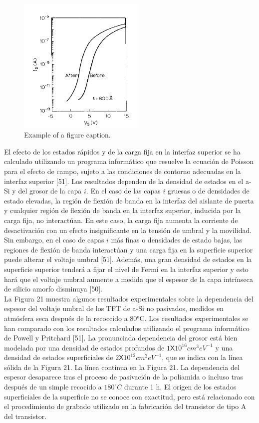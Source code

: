 \documentclass[conference]{IEEEtran}
\begin{document}
\begin{figure}[htbp]
    \centerline{\includegraphics[width=6.0cm]{img/imagen-20.png}}
    \caption{Example of a figure caption.}%
    \label{fig20}
\end{figure} 

    El efecto de los estados rápidos y de la carga fija en la interfaz superior se ha calculado 
    utilizando un programa informático que resuelve la ecuación de Poisson para el efecto de campo, 
    sujeto a las condiciones de contorno adecuadas en la interfaz superior [51].
    Los resultados dependen de la densidad de estados en el a-Si y del grosor de la capa $i$. 
    En el caso de las capas $i$ gruesas o de densidades de estado elevadas, la región de flexión 
    de banda en la interfaz del aislante de puerta y cualquier región de flexión de banda en la 
    interfaz superior, inducida por la carga fija, no interactúan. En este caso, la carga fija 
    aumenta la corriente de desactivación con un efecto insignificante en la tensión de umbral y 
    la movilidad. Sin embargo, en el caso de capas $i$ más finas o densidades de estado bajas, 
    las regiones de flexión de banda interactúan y una carga fija en la superficie superior puede 
    alterar el voltaje umbral [51]. Además, una gran densidad de estados en la superficie superior 
    tenderá a fijar el nivel de Fermi en la interfaz superior y esto hará que el voltaje umbral 
    aumente a medida que el espesor de la capa intrínseca de silicio amorfo disminuya [50].
    \\
    La Figura 21 muestra algunos resultados experimentales sobre la dependencia del espesor 
    del voltaje umbral de los TFT de a-Si no pasivados, medidos en atmósfera seca después de 
    la recoccido a 80°C. Los resultados experimentales se han comparado con los resultados calculados 
    utilizando el programa informático de Powell y Pritchard [51]. La pronunciada dependencia del grosor 
    está bien modelada por una densidad de estados profundos de $1 \mathsf{X} 10^{16} cm^3 eV^{-1}$ y una 
    densidad de estados superficiales de $2 \mathsf{X} 10^{12} cm^2 eV^{-1}$, que se indica con la línea 
    sólida de la Figura 21. La línea continua en la Figura 21. La dependencia del espesor desaparece tras 
    el proceso de pasivación de la poliamida o incluso tras después de un simple recocido a $180^{\circ}C$ 
    durante 1 h. El origen de los estados superficiales de la superficie no se conoce con exactitud, pero 
    está relacionado con el procedimiento de grabado utilizado en la fabricación del transistor de tipo A 
    del transistor.
\end{document}
